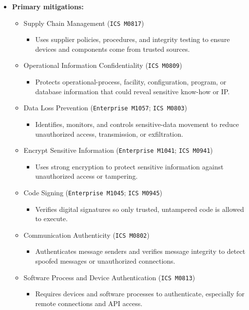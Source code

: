 \documentclass[10pt,a4paper,oneside]{report}
\begin{document}
\begin{itemize}
\item \textbf{Primary mitigations:}
\begin{itemize}
\item Supply Chain Management (\texttt{ICS M0817})
\begin{itemize}
\item Uses supplier policies, procedures, and integrity testing to ensure devices and components come from trusted sources.
\end{itemize}
\item Operational Information Confidentiality (\texttt{ICS M0809})
\begin{itemize}
\item Protects operational-process, facility, configuration, program, or database information that could reveal sensitive know-how or IP.
\end{itemize}
\item Data Loss Prevention (\texttt{Enterprise M1057}; \texttt{ICS M0803})
\begin{itemize}
\item Identifies, monitors, and controls sensitive-data movement to reduce unauthorized access, transmission, or exfiltration.
\end{itemize}
\item Encrypt Sensitive Information (\texttt{Enterprise M1041}; \texttt{ICS M0941})
\begin{itemize}
\item Uses strong encryption to protect sensitive information against unauthorized access or tampering.
\end{itemize}
\item Code Signing (\texttt{Enterprise M1045}; \texttt{ICS M0945})
\begin{itemize}
\item Verifies digital signatures so only trusted, untampered code is allowed to execute.
\end{itemize}
\item Communication Authenticity (\texttt{ICS M0802})
\begin{itemize}
\item Authenticates message senders and verifies message integrity to detect spoofed messages or unauthorized connections.
\end{itemize}
\item Software Process and Device Authentication (\texttt{ICS M0813})
\begin{itemize}
\item Requires devices and software processes to authenticate, especially for remote connections and API access.

\end{itemize}
\end{itemize}
\end{itemize}
\end{document}
